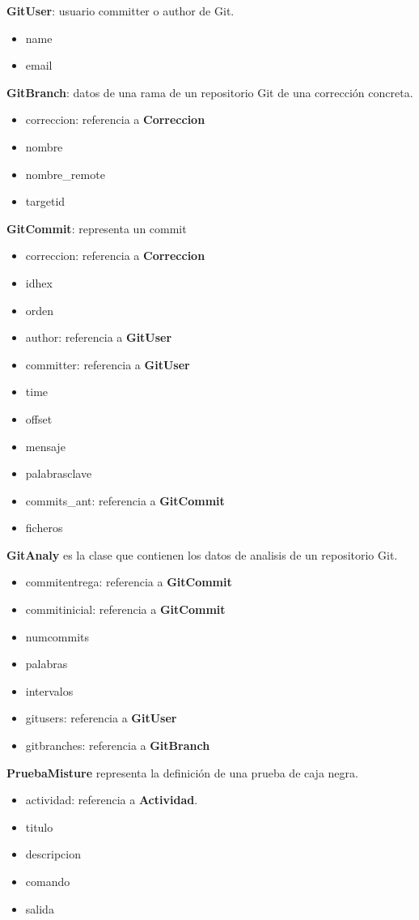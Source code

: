 \textbf{GitUser}: usuario committer o author de Git.
\begin{itemize}
\item  name
\item email
\end{itemize}


\textbf{GitBranch}: datos de una rama de un repositorio Git de una corrección concreta.
\begin{itemize}
\item correccion: referencia a \textbf{Correccion}
\item nombre
\item nombre\_remote
\item targetid
\end{itemize}


\textbf{GitCommit}: representa un commit
\begin{itemize}
\item correccion: referencia a \textbf{Correccion}
\item idhex
\item orden
\item author: referencia a \textbf{GitUser}
\item committer: referencia a \textbf{GitUser}
\item time
\item offset
\item mensaje
\item palabrasclave
\item commits\_ant: referencia a \textbf{GitCommit}
\item ficheros
\end{itemize}


\textbf{GitAnaly} es la clase que contienen los datos de analisis de un repositorio Git.
\begin{itemize}
\item commitentrega: referencia a \textbf{GitCommit}
\item commitinicial: referencia a \textbf{GitCommit}
\item numcommits
\item palabras
\item intervalos
\item gitusers: referencia a \textbf{GitUser}
\item gitbranches: referencia a \textbf{GitBranch}
\end{itemize}


\textbf{PruebaMisture} representa la definición de una prueba de caja negra.
\begin{itemize}
\item actividad: referencia a \textbf{Actividad}.
\item titulo
\item descripcion
\item comando
\item salida
\end{itemize}


